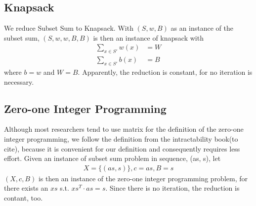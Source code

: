 \subsection{Knapsack}
We reduce Subset Sum to Knapsack. With $(S, w, B)$ as an instance of the subset sum, $(S, w, w, B, B)$
is then an instance of knapsack with 
\begin{align*}
    \sum_{x \in S'} w(x) &= W \\ 
    \sum_{x \in S'} b(x) &= B
\end{align*}
where $b = w$ and $W = B$. Apparently, the reduction is constant, for no iteration is necessary. 

\subsection{Zero-one Integer Programming}
Although most researchers tend to use matrix for the 
definition of the zero-one integer programming, we follow the definition from the intractability book(to cite), because 
it is convenient for our definition and consequently requires less effort. Given an instance of subset sum problem in sequence,
(as, s), let 
\begin{align*}
    X = \{(as, s)\}, c = as, B = s
\end{align*} 
$(X, c, B)$ is then an instance of the zero-one integer programming problem,
for there exists an $xs$ s.t. $xs^T \cdot as = s$. Since there is no iteration, the reduction is contant, too.

